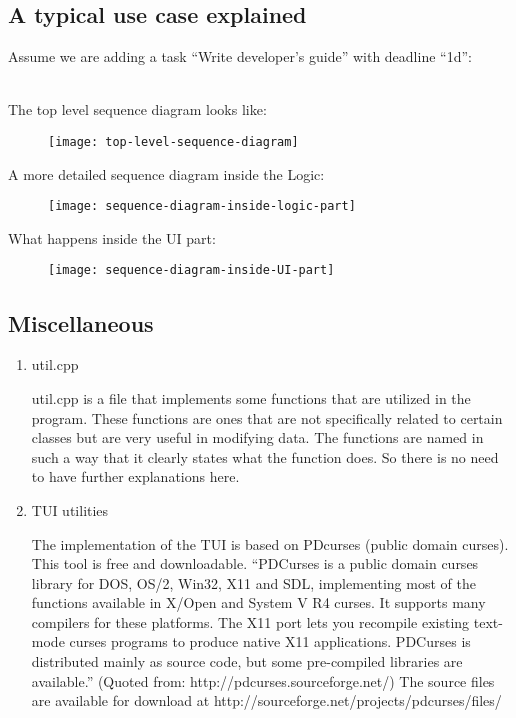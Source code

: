 \documentclass[12pt, a4paper]{article}
\begin{document}
\subsection{A typical use case explained}
Assume we are adding a task ``Write developer’s guide'' with deadline ``1d'':

\\The top level sequence diagram looks like:
\begin{figure}[h]
  \centering
  \texttt{[image: top-level-sequence-diagram]}
\end{figure}

A more detailed sequence diagram inside the Logic:
\begin{figure}[h]
  \centering
  \texttt{[image: sequence-diagram-inside-logic-part]}
\end{figure}


What happens inside the UI part:
\begin{figure}[h]
  \centering
  \texttt{[image: sequence-diagram-inside-UI-part]}
\end{figure}

\subsection{Miscellaneous}
\begin{enumerate}
\item util.cpp

util.cpp is a file that implements some functions that are utilized in the program. These
functions are ones that are not specifically related to certain classes but are very useful
in modifying data. The functions are named in such a way that it clearly states what the
function does. So there is no need to have further explanations here.
\item TUI utilities

The implementation of the TUI is based on PDcurses (public domain curses). This tool is
free and downloadable. “PDCurses is a public domain curses library for DOS, OS/2,
Win32, X11 and SDL, implementing most of the functions available in X/Open and
System V R4 curses. It supports many compilers for these platforms. The X11 port lets
you recompile existing text-mode curses programs to produce native X11 applications.
PDCurses is distributed mainly as source code, but some pre-compiled libraries are
available.” (Quoted from: http://pdcurses.sourceforge.net/) The source files are available
for download at http://sourceforge.net/projects/pdcurses/files/
\end{enumerate}
\end{document}
